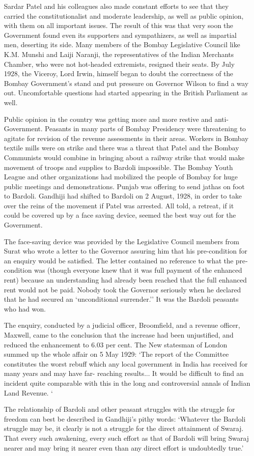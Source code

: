 Sardar Patel and his colleagues also made constant efforts to see that they carried the constitutionalist and moderate leadership, as well as public opinion, with them on all important issues. The result of this was that very soon the Government found even its supporters and sympathizers, as well as impartial men, deserting its side. Many members of the Bombay Legislative Council like K.M. Munshi and Laiji Naranji, the representatives of the Indian Merchants Chamber, who were not hot-headed extremists, resigned their seats. By July 1928, the Viceroy, Lord Irwin, himself began to doubt the correctness of the Bombay Government's stand and put pressure on Governor Wilson to find a way out. Uncomfortable questions had started appearing in the British Parliament as well.

Public opinion in the country was getting more and more restive and anti-Government. Peasants in many parts of Bombay Presidency were threatening to agitate for revision of the revenue assessments in their areas. Workers in Bombay textile mills were on strike and there was a threat that Patel and the Bombay Communists would combine in bringing about a railway strike that would make movement of troops and supplies to Bardoli impossible. The Bombay Youth League and other organizations had mobilized the people of Bombay for huge public meetings and demonstrations. Punjab was offering to send jathas on foot to Bardoli. Gandhiji had shifted to Bardoli on 2 August, 1928, in order to take over the reins of the movement if Patel was arrested. All told, a retreat, if it could be covered up by a face saving device, seemed the best way out for the Government.

The face-saving device was provided by the Legislative Council members from Surat who wrote a letter to the Governor assuring him that his pre-condition for an enquiry would be satisfied. The letter contained no reference to what the pre­ condition was (though everyone knew that it was full payment of the enhanced rent) because an understanding had already been reached that the full enhanced rent would not be paid. Nobody took the Governor seriously when he declared that he had secured an `unconditional surrender.'' It was the Bardoli peasants who had won.

The enquiry, conducted by a judicial officer, Broomfield, and a revenue officer, Maxwell, came to the conclusion that the increase had been unjustified, and reduced the enhancement to 6.03 per cent. The New statesman of London summed up the whole affair on 5 May 1929: `The report of the Committee constitutes the worst rebuff which any local government in India has received for many years and may have far- reaching results... It would be difficult to find an incident quite comparable with this in the long and controversial annals of Indian Land Revenue. `

The relationship of Bardoli and other peasant struggles with the struggle for freedom can best be described in Gandhiji's pithy words: `Whatever the Bardoli struggle may be, it clearly is not a struggle for the direct attainment of Swaraj. That every such awakening, every such effort as that of Bardoli will bring Swaraj nearer and may bring it nearer even than any direct effort is undoubtedly true.'
